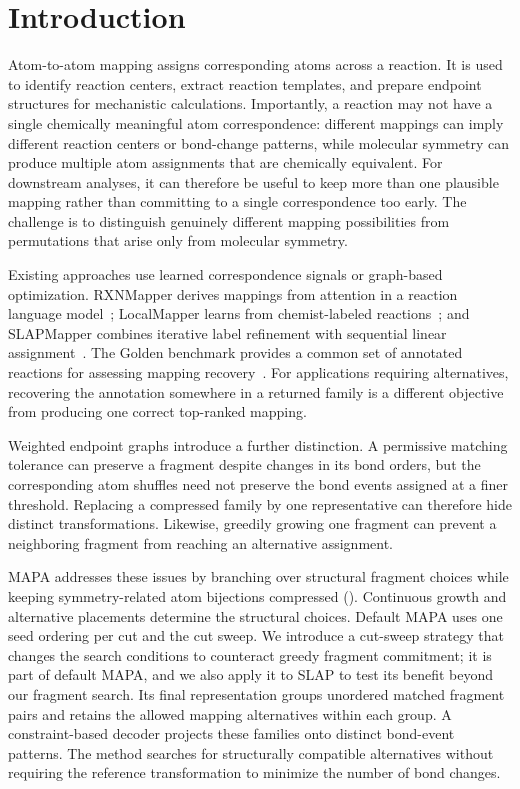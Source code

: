 \section{Introduction}

Atom-to-atom mapping assigns corresponding atoms across a reaction. It is used to identify reaction centers, extract reaction templates, and prepare endpoint structures for mechanistic calculations. Importantly, a reaction may not have a single chemically meaningful atom correspondence: different mappings can imply different reaction centers or bond-change patterns, while molecular symmetry can produce multiple atom assignments that are chemically equivalent. For downstream analyses, it can therefore be useful to keep more than one plausible mapping rather than committing to a single correspondence too early. The challenge is to distinguish genuinely different mapping possibilities from permutations that arise only from molecular symmetry.

Existing approaches use learned correspondence signals or graph-based optimization. RXNMapper derives mappings from attention in a reaction language model~\citep{schwaller2021}; LocalMapper learns from chemist-labeled reactions~\citep{chen2024}; and SLAPMapper combines iterative label refinement with sequential linear assignment~\citep{koda2025}. The Golden benchmark provides a common set of annotated reactions for assessing mapping recovery~\citep{lin2022}. For applications requiring alternatives, recovering the annotation somewhere in a returned family is a different objective from producing one correct top-ranked mapping.

Weighted endpoint graphs introduce a further distinction. A permissive matching tolerance can preserve a fragment despite changes in its bond orders, but the corresponding atom shuffles need not preserve the bond events assigned at a finer threshold. Replacing a compressed family by one representative can therefore hide distinct transformations. Likewise, greedily growing one fragment can prevent a neighboring fragment from reaching an alternative assignment.

MAPA addresses these issues by branching over structural fragment choices while keeping symmetry-related atom bijections compressed (). Continuous growth and alternative placements determine the structural choices. Default MAPA uses one seed ordering per cut and the cut sweep. We introduce a cut-sweep strategy that changes the search conditions to counteract greedy fragment commitment; it is part of default MAPA, and we also apply it to SLAP to test its benefit beyond our fragment search. Its final representation groups unordered matched fragment pairs and retains the allowed mapping alternatives within each group. A constraint-based decoder projects these families onto distinct bond-event patterns. The method searches for structurally compatible alternatives without requiring the reference transformation to minimize the number of bond changes.

